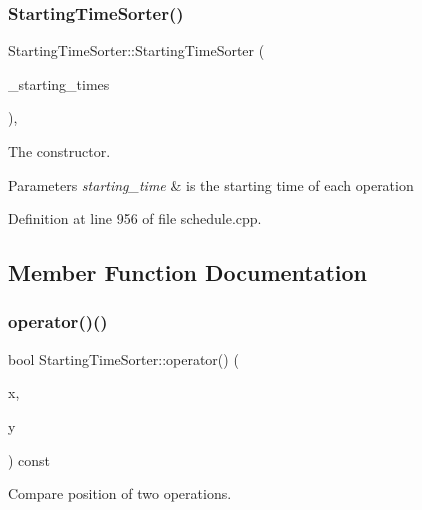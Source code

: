 \subsubsection{\texorpdfstring{Starting\+Time\+Sorter()}{StartingTimeSorter()}}
{\footnotesize\ttfamily Starting\+Time\+Sorter\+::\+Starting\+Time\+Sorter (\begin{DoxyParamCaption}\item[{const \hyperlink{custom__map_8hpp_a18ca01763abbe3e5623223bfe5aaac6b}{Custom\+Map}$<$ unsigned int, double $>$ \&}]{\+\_\+starting\+\_\+times }\end{DoxyParamCaption})\hspace{0.3cm}{\ttfamily [inline]}, {\ttfamily [explicit]}}



The constructor. 


\begin{DoxyParams}{Parameters}
{\em starting\+\_\+time} & is the starting time of each operation \\
\hline
\end{DoxyParams}


Definition at line 956 of file schedule.\+cpp.



\subsection{Member Function Documentation}
\mbox{\label{classStartingTimeSorter_aede3b73bfb8a76fda1d6f77a328500b1}} 
\subsubsection{\texorpdfstring{operator()()}{operator()()}}
{\footnotesize\ttfamily bool Starting\+Time\+Sorter\+::operator() (\begin{DoxyParamCaption}\item[{const unsigned int}]{x,  }\item[{const unsigned int}]{y }\end{DoxyParamCaption}) const\hspace{0.3cm}{\ttfamily [inline]}}



Compare position of two operations. 


